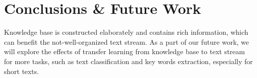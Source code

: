 \documentclass[runningheads,a4paper]{llncs}
\begin{document}

\section{Conclusions \& Future Work}
Knowledge base is constructed elaborately and contains rich information, which can benefit the not-well-organized text stream. 
As a part of our future work, we will explore the effects of transfer learning from knowledge base to text stream for more tasks, such as text classification and key words extraction, especially for short texts. 

\newpage

\small

\end{document}
